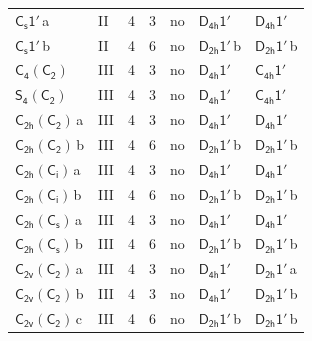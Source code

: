 \documentclass[10pt,a4paper]{article}
\numberwithin{equation}{section}
\newcommand{\grp}[1]{\mathsf{#1}}
\newcommand{\clsletter}[1]{\,{\scriptsize\color{black!55}#1}}
\begin{document}
{\begin{longtable}{@{}llrrlll@{}}
\href{C1v-1p.pdf}{$\grp{C_{s}1'}$}\clsletter{a} & II & 4 & 3 & no & \href{D4h-1p.pdf}{$\grp{D_{4h}1'}$} & \href{D4h-1p.pdf}{$\grp{D_{4h}1'}$}\\
\href{C1v-1p.pdf}{$\grp{C_{s}1'}$}\clsletter{b} & II & 4 & 6 & no & \href{D2h-1p.pdf}{$\grp{D_{2h}1'}$}\clsletter{b} & \href{D2h-1p.pdf}{$\grp{D_{2h}1'}$}\clsletter{b}\\
\href{C4-C2.pdf}{$\grp{C_{4}}(\grp{C_{2}})$} & III & 4 & 3 & no & \href{D4h-1p.pdf}{$\grp{D_{4h}1'}$} & \href{C4h-1p.pdf}{$\grp{C_{4h}1'}$}\\
\href{S4-C2.pdf}{$\grp{S_{4}}(\grp{C_{2}})$} & III & 4 & 3 & no & \href{D4h-1p.pdf}{$\grp{D_{4h}1'}$} & \href{C4h-1p.pdf}{$\grp{C_{4h}1'}$}\\
\href{C2h-C2.pdf}{$\grp{C_{2h}}(\grp{C_{2}})$}\clsletter{a} & III & 4 & 3 & no & \href{D4h-1p.pdf}{$\grp{D_{4h}1'}$} & \href{D4h-1p.pdf}{$\grp{D_{4h}1'}$}\\
\href{C2h-C2.pdf}{$\grp{C_{2h}}(\grp{C_{2}})$}\clsletter{b} & III & 4 & 6 & no & \href{D2h-1p.pdf}{$\grp{D_{2h}1'}$}\clsletter{b} & \href{D2h-1p.pdf}{$\grp{D_{2h}1'}$}\clsletter{b}\\
\href{C2h-S2.pdf}{$\grp{C_{2h}}(\grp{C_{i}})$}\clsletter{a} & III & 4 & 3 & no & \href{D4h-1p.pdf}{$\grp{D_{4h}1'}$} & \href{D4h-1p.pdf}{$\grp{D_{4h}1'}$}\\
\href{C2h-S2.pdf}{$\grp{C_{2h}}(\grp{C_{i}})$}\clsletter{b} & III & 4 & 6 & no & \href{D2h-1p.pdf}{$\grp{D_{2h}1'}$}\clsletter{b} & \href{D2h-1p.pdf}{$\grp{D_{2h}1'}$}\clsletter{b}\\
\href{C2h-C1v.pdf}{$\grp{C_{2h}}(\grp{C_{s}})$}\clsletter{a} & III & 4 & 3 & no & \href{D4h-1p.pdf}{$\grp{D_{4h}1'}$} & \href{D4h-1p.pdf}{$\grp{D_{4h}1'}$}\\
\href{C2h-C1v.pdf}{$\grp{C_{2h}}(\grp{C_{s}})$}\clsletter{b} & III & 4 & 6 & no & \href{D2h-1p.pdf}{$\grp{D_{2h}1'}$}\clsletter{b} & \href{D2h-1p.pdf}{$\grp{D_{2h}1'}$}\clsletter{b}\\
\href{C2v-C2.pdf}{$\grp{C_{2v}}(\grp{C_{2}})$}\clsletter{a} & III & 4 & 3 & no & \href{D4h-1p.pdf}{$\grp{D_{4h}1'}$} & \href{D2h-1p.pdf}{$\grp{D_{2h}1'}$}\clsletter{a}\\
\href{C2v-C2.pdf}{$\grp{C_{2v}}(\grp{C_{2}})$}\clsletter{b} & III & 4 & 3 & no & \href{D4h-1p.pdf}{$\grp{D_{4h}1'}$} & \href{D2h-1p.pdf}{$\grp{D_{2h}1'}$}\clsletter{b}\\
\href{C2v-C2.pdf}{$\grp{C_{2v}}(\grp{C_{2}})$}\clsletter{c} & III & 4 & 6 & no & \href{D2h-1p.pdf}{$\grp{D_{2h}1'}$}\clsletter{b} & \href{D2h-1p.pdf}{$\grp{D_{2h}1'}$}\clsletter{b}\\

\end{longtable}}
\end{document}
